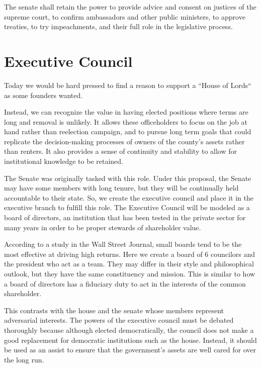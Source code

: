 \documentclass{article}
\begin{document}
\begin{quoting}
The senate shall retain the power to provide advice and consent on justices of the supreme court, to confirm ambassadors and other public ministers, to approve treaties, to try impeachments, and their full role in the legislative process.
\end{quoting}

\section{Executive Council}

Today we would be hard pressed to find a reason to support a “House of Lords“ as some founders wanted.

Instead, we can recognize the value in having elected positions where terms are long and removal is unlikely. It allows these officeholders to focus on the job at hand rather than reelection campaign, and to pursue long term goals that could replicate the decision-making processes of owners of the county's assets rather than renters. It also provides a sense of continuity and stability to allow for institutional knowledge to be retained.

The Senate was originally tasked with this role. Under this proposal, the Senate may have some members with long tenure, but they will be continually held accountable to their state. So, we create the executive council and place it in the executive branch to fulfill this role. The Executive Council will be modeled as a board of directors, an institution that has been tested in the private sector for many years in order to be proper stewards of shareholder value.

According to a study in the Wall Street Journal, small boards tend to be the most effective at driving high returns\cite{Lublin}. Here we create a board of 6 councilors and the president who act as a team. They may differ in their style and philosophical outlook, but they have the same constituency and mission. This is similar to how a board of directors has a fiduciary duty to act in the interests of the common shareholder.

This contrasts with the house and the senate whose members represent adversarial interests. The powers of the executive council must be debated thoroughly because although elected democratically, the council does not make a good replacement for democratic institutions such as the house. Instead, it should be used as an assist to ensure that the government's assets are well cared for over the long run.
\end{document}
